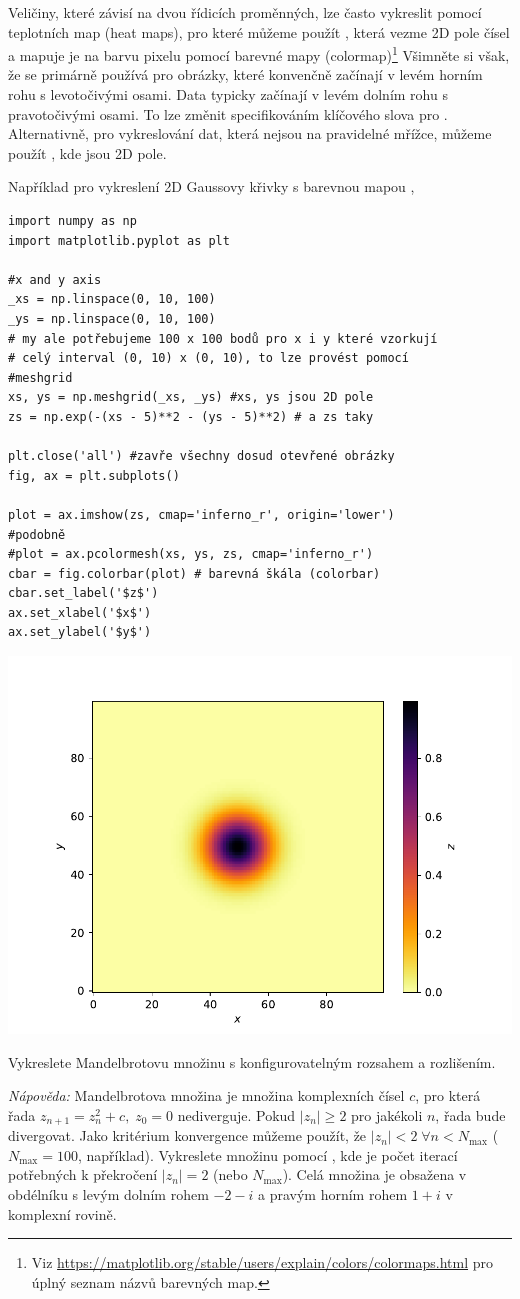 Veličiny, které závisí na dvou řídicích proměnných, lze často vykreslit pomocí teplotních map (heat maps), pro které můžeme použít , která vezme 2D pole čísel a mapuje je na barvu pixelu pomocí barevné mapy (colormap)\footnote{Viz \url{https://matplotlib.org/stable/users/explain/colors/colormaps.html} pro úplný seznam názvů barevných map.} Všimněte si však, že  se primárně používá pro obrázky, které konvenčně začínají v levém horním rohu s levotočivými osami. Data typicky začínají v levém dolním rohu s pravotočivými osami. To lze změnit specifikováním klíčového slova  pro . Alternativně, pro vykreslování dat, která nejsou na pravidelné mřížce, můžeme použít , kde  jsou 2D pole.

Například pro vykreslení 2D Gaussovy křivky s barevnou mapou ,
\begin{lstlisting}[caption=Příklad dvourozměrného vykreslování.]
import numpy as np
import matplotlib.pyplot as plt

#x and y axis
_xs = np.linspace(0, 10, 100)
_ys = np.linspace(0, 10, 100)
# my ale potřebujeme 100 x 100 bodů pro x i y které vzorkují
# celý interval (0, 10) x (0, 10), to lze provést pomocí
#meshgrid
xs, ys = np.meshgrid(_xs, _ys) #xs, ys jsou 2D pole
zs = np.exp(-(xs - 5)**2 - (ys - 5)**2) # a zs taky

plt.close('all') #zavře všechny dosud otevřené obrázky
fig, ax = plt.subplots()

plot = ax.imshow(zs, cmap='inferno_r', origin='lower')
#podobně
#plot = ax.pcolormesh(xs, ys, zs, cmap='inferno_r') 
cbar = fig.colorbar(plot) # barevná škála (colorbar)
cbar.set_label('$z$')
ax.set_xlabel('$x$')
ax.set_ylabel('$y$')
\end{lstlisting}
\begin{center}
    \includegraphics[width=0.5\linewidth]{gaussian_2D.pdf}
\end{center}
\begin{exercise}
    Vykreslete Mandelbrotovu množinu s konfigurovatelným rozsahem a rozlišením.

    \emph{Nápověda:} Mandelbrotova množina je množina komplexních čísel $c$, pro která řada $z_{n+1} = z_n^2 + c,\; z_0 = 0$ nediverguje. Pokud $|z_n| \geq 2$ pro jakékoli $n$, řada bude divergovat. Jako kritérium konvergence můžeme použít, že $|z_n| < 2\; \forall n < N_\mathrm{max}$ ($N_\mathrm{max} = 100$, například). Vykreslete množinu pomocí , kde  je počet iterací potřebných k překročení $|z_n| = 2$ (nebo $N_\mathrm{max}$). Celá množina je obsažena v obdélníku s levým dolním rohem $-2-i$ a pravým horním rohem $1+i$ v komplexní rovině.
\end{exercise}

